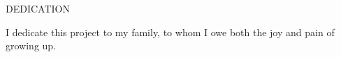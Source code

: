 \newpage
{}

\begin{center}
DEDICATION
\end{center}

\begin{center}
I dedicate this project to my family, to whom I owe both the joy and pain of growing up.  
\end{center}

